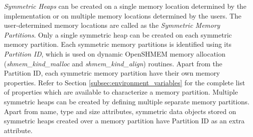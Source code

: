 \emph{Symmetric Heaps} can be created on a single memory location determined by
the implementation or on multiple memory locations determined by the users. The
user-determined memory locations are called as the \emph{Symmetric Memory
Partitions}. Only a single symmetric heap can be created on each symmetric
memory partition. Each symmetric memory partitions is identified using its
\emph{Partition ID}, which is used on dynamic OpenSHMEM memory allocation 
(\textit{shmem\_kind\_malloc} and \textit{shmem\_kind\_align}) routines. Apart
from the Partition ID, each symmetric memory partition have their own memory
properties. Refer to Section \ref{subsec:environment_variables} for the
complete list of properties which are available to characterize a memory
partition. Multiple symmetric heaps can be created by defining multiple
separate memory partitions. Apart from name, type and size attributes,
symmetric data objects stored on symmetric heaps created over a memory
partition have Partition ID as an extra attribute.